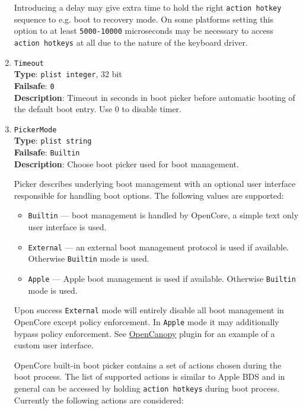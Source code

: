 \documentclass[]{article}
\providecommand{\tightlist}{%
  \setlength{\itemsep}{0pt}\setlength{\parskip}{0pt}}
\begin{document}
\begin{enumerate}
  Introducing a delay may give extra time to hold the right \texttt{action hotkey}
  sequence to e.g. boot to recovery mode. On some platforms setting this option to
  at least \texttt{5000-10000} microseconds may be necessary to access
  \texttt{action hotkeys} at all due to the nature of the keyboard driver.

\item
  \texttt{Timeout}\\
  \textbf{Type}: \texttt{plist\ integer}, 32 bit\\
  \textbf{Failsafe}: \texttt{0}\\
  \textbf{Description}: Timeout in seconds in boot picker before
  automatic booting of the default boot entry. Use 0 to disable timer.

\item
  \texttt{PickerMode}\\
  \textbf{Type}: \texttt{plist\ string}\\
  \textbf{Failsafe}: \texttt{Builtin}\\
  \textbf{Description}: Choose boot picker used for boot management.

  Picker describes underlying boot management with an optional user interface
  responsible for handling boot options. The following values are supported:

  \begin{itemize}
  \tightlist
  \item \texttt{Builtin} --- boot management is handled by OpenCore, a simple
  text only user interface is used.
  \item \texttt{External} --- an external boot management protocol is used
  if available. Otherwise \texttt{Builtin} mode is used.
  \item \texttt{Apple} --- Apple boot management is used if available.
  Otherwise \texttt{Builtin} mode is used.
  \end{itemize}

  Upon success \texttt{External} mode will entirely disable all boot management
  in OpenCore except policy enforcement. In \texttt{Apple} mode it may additionally
  bypass policy enforcement. See \hyperref[ueficanopy]{OpenCanopy} plugin
  for an example of a custom user interface.

  OpenCore built-in boot picker contains a set of actions chosen during the boot process.
  The list of supported actions is similar to Apple BDS and in general can be accessed by
  holding \texttt{action hotkeys} during boot process. Currently the following actions are
  considered:


\end{enumerate}
\end{document}
